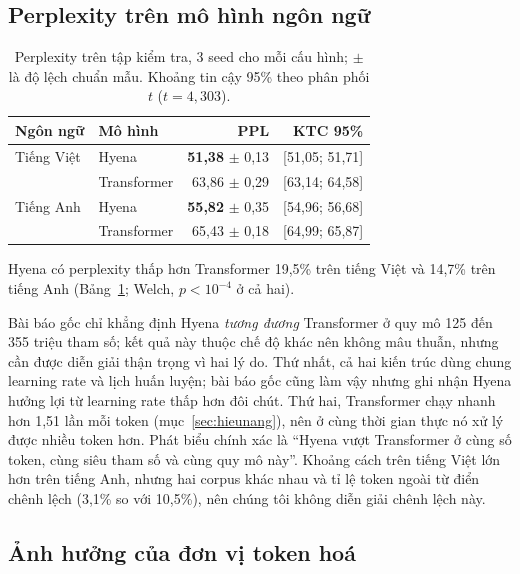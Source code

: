 \documentclass[11pt]{article}
\begin{document}
\subsection{Perplexity trên mô hình ngôn ngữ}

\begin{table}[t]
\centering
\setlength{\tabcolsep}{2pt}
\small
\begin{tabular}{llrr}
\toprule
Ngôn ngữ & Mô hình & PPL & KTC 95\% \\
\midrule
Tiếng Việt & Hyena       & \textbf{51,38} $\pm$ 0,13 & [51,05; 51,71] \\
           & Transformer & 63,86 $\pm$ 0,29 & [63,14; 64,58] \\
\midrule
Tiếng Anh  & Hyena       & \textbf{55,82} $\pm$ 0,35 & [54,96; 56,68] \\
           & Transformer & 65,43 $\pm$ 0,18 & [64,99; 65,87] \\
\bottomrule
\end{tabular}
\caption{Perplexity trên tập kiểm tra, 3 seed cho mỗi cấu hình; $\pm$ là độ
lệch chuẩn mẫu. Khoảng tin cậy 95\% theo phân phối $t$ ($t = 4{,}303$).}
\label{tab:e1}
\end{table}

Hyena có perplexity thấp hơn Transformer 19,5\% trên tiếng Việt và 14,7\% trên
tiếng Anh (Bảng~\ref{tab:e1}; Welch, $p < 10^{-4}$ ở cả hai).

Bài báo gốc chỉ khẳng định Hyena \emph{tương đương} Transformer ở quy mô 125 đến
355 triệu tham số; kết quả này thuộc chế độ khác nên không mâu thuẫn, nhưng cần
được diễn giải thận trọng vì hai lý do. Thứ nhất, cả hai kiến trúc dùng chung
learning rate và lịch huấn luyện; bài báo gốc cũng làm vậy nhưng ghi nhận Hyena hưởng lợi từ learning rate
thấp hơn đôi chút. Thứ hai, Transformer chạy nhanh hơn 1,51 lần mỗi token
(mục~\ref{sec:hieunang}), nên ở cùng thời gian thực nó xử lý được nhiều token
hơn. Phát biểu chính xác là ``Hyena vượt Transformer ở cùng số token, cùng siêu tham
số và cùng quy mô này''. Khoảng cách trên tiếng Việt lớn hơn trên tiếng Anh,
nhưng hai corpus khác nhau và tỉ lệ token ngoài từ điển chênh lệch (3,1\% so với
10,5\%), nên chúng tôi không diễn giải chênh lệch này.

\subsection{Ảnh hưởng của đơn vị token hoá}
\end{document}
